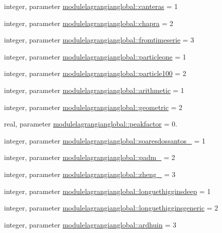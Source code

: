 \begin{DoxyCompactItemize}
\item 
integer, parameter \mbox{\hyperlink{namespacemodulelagrangianglobal_a6a1d48f117533bfa05114a1d9180ea6f}{modulelagrangianglobal\+::canteras}} = 1
\item 
integer, parameter \mbox{\hyperlink{namespacemodulelagrangianglobal_a390066d8a858f9de06ab1dfc1456897d}{modulelagrangianglobal\+::chapra}} = 2
\item 
integer, parameter \mbox{\hyperlink{namespacemodulelagrangianglobal_abdc80f8446abcc803e1b4a76eccd45b2}{modulelagrangianglobal\+::fromtimeserie}} = 3
\item 
integer, parameter \mbox{\hyperlink{namespacemodulelagrangianglobal_a581a217d7c4160223d988c8e86742814}{modulelagrangianglobal\+::particleone}} = 1
\item 
integer, parameter \mbox{\hyperlink{namespacemodulelagrangianglobal_a11d3726a417de8d928874f53f2e8d759}{modulelagrangianglobal\+::particle100}} = 2
\item 
integer, parameter \mbox{\hyperlink{namespacemodulelagrangianglobal_a837ab16272dfe57078d78e90cf4c1240}{modulelagrangianglobal\+::arithmetic}} = 1
\item 
integer, parameter \mbox{\hyperlink{namespacemodulelagrangianglobal_a661d6efc659f0c7f7b85158f0c4e1d98}{modulelagrangianglobal\+::geometric}} = 2
\item 
real, parameter \mbox{\hyperlink{namespacemodulelagrangianglobal_a99e43c25546e6fa95e08c400d6a21460}{modulelagrangianglobal\+::peakfactor}} = 0.
\item 
integer, parameter \mbox{\hyperlink{namespacemodulelagrangianglobal_a045b00b0bf74d2b3aa1c88ed126390a1}{modulelagrangianglobal\+::soaresdossantos\+\_\+}} = 1
\item 
integer, parameter \mbox{\hyperlink{namespacemodulelagrangianglobal_a2ae762c82187b0f444aecdfc5929627b}{modulelagrangianglobal\+::padm\+\_\+}} = 2
\item 
integer, parameter \mbox{\hyperlink{namespacemodulelagrangianglobal_ae1877dfc79c08df3b0c92dad1f6cfadc}{modulelagrangianglobal\+::zheng\+\_\+}} = 3
\item 
integer, parameter \mbox{\hyperlink{namespacemodulelagrangianglobal_a5ba72823c8585af566872f84164c343e}{modulelagrangianglobal\+::longuethigginsdeep}} = 1
\item 
integer, parameter \mbox{\hyperlink{namespacemodulelagrangianglobal_a90f80a166b384ba2e71ad5017fa9e37f}{modulelagrangianglobal\+::longuethigginsgeneric}} = 2
\item 
integer, parameter \mbox{\hyperlink{namespacemodulelagrangianglobal_a0a1e7b7db30846e92b7f5c98e665c0c7}{modulelagrangianglobal\+::ardhuin}} = 3

\end{DoxyCompactItemize}
